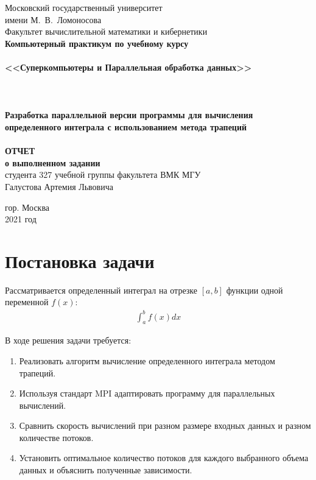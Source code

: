 \documentclass[a4paper,12pt,titlepage,finall]{article}
\begin{document}
\begin{titlepage}
    \begin{center}
	{\small \sc Московский государственный университет \\имени М.~В.~Ломоносова\\
	Факультет вычислительной математики и кибернетики\\}
	\hrulefill
	\vfill
	{\large \bf Компьютерный практикум по учебному курсу}\\
	~\\
	{\Large \bf <<Суперкомпьютеры и Параллельная
обработка данных>>}\\ 
	~\\
	~\\
	~\\
	{\bf Разработка параллельной версии программы для вычисления определенного интеграла с использованием метода трапеций}\\
	~\\
	{\large \bf ОТЧЕТ}\\
	{\bf о выполненном задании}\\
	{студента 327 учебной группы факультета ВМК МГУ}\\
	{Галустова Артемия Львовича}
    \end{center}
    
    \begin{center}
	\vfill
	{\small гор. Москва\\2021 год}
    \end{center}
\end{titlepage}

\tableofcontents
\newpage
\section{Постановка задачи}
Рассматривается определенный интеграл на отрезке $[a,b]$ функции одной переменной $f(x)$:
\begin{align*}
\int^b_a f(x) dx
\end{align*}

В ходе решения задачи требуется:
\begin{enumerate}
\item Реализовать алгоритм вычисление определенного интеграла методом трапеций.
\item Используя стандарт MPI адаптировать программу для параллельных вычислений.
\item Сравнить скорость вычислений при разном размере входных данных и разном количестве потоков.
\item Установить оптимальное количество потоков для каждого выбранного объема данных и объяснить полученные зависимости.
\end{enumerate}
\newpage
\end{document}
